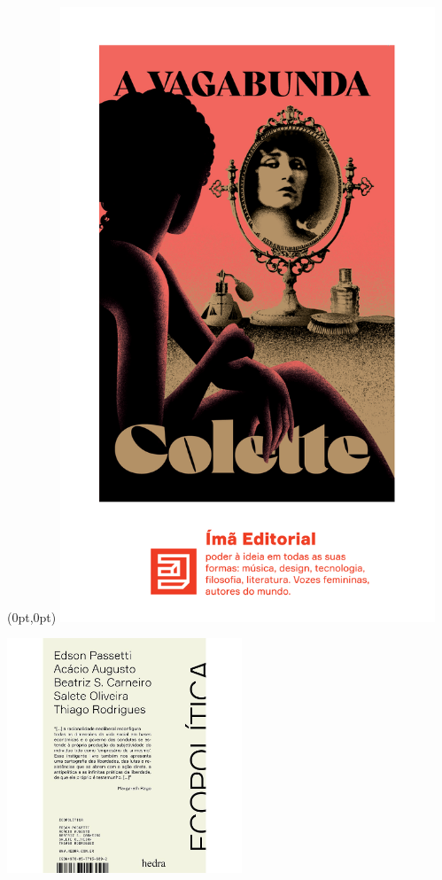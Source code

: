 \pagestyle{ima}
\label{ima}

\begin{textblock*}{5.625in}(0pt,0pt)%
\vspace*{-1.45cm}
\hspace*{-1.2cm}\includegraphics*[width=112mm]{./imgs/IMA.png}
\end{textblock*}

\pagebreak

\hspace{.5cm}

\begin{center}
\hspace*{-.5cm}\includegraphics[width=70mm]{eco.jpeg}
\end{center}

